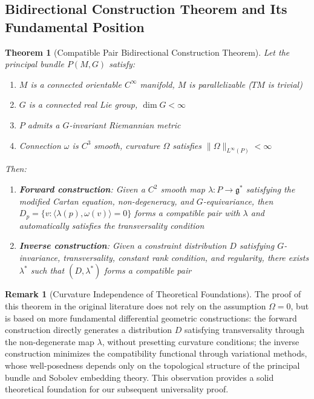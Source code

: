 \documentclass[a4paper,12pt]{extarticle}
\newtheorem{theorem}{Theorem}
\theoremstyle{definition}
\newtheorem{remark}{Remark}
\begin{document}
\subsection{Bidirectional Construction Theorem and Its Fundamental Position}

\begin{theorem}[Compatible Pair Bidirectional Construction Theorem\cite{zheng2025dynamical}]
Let the principal bundle $P(M, G)$ satisfy:
\begin{enumerate}
\item $M$ is a connected orientable $C^\infty$ manifold, $M$ is parallelizable ($TM$ is trivial)
\item $G$ is a connected real Lie group, $\dim G < \infty$
\item $P$ admits a $G$-invariant Riemannian metric
\item Connection $\omega$ is $C^3$ smooth, curvature $\Omega$ satisfies $\|\Omega\|_{L^\infty(P)} < \infty$
\end{enumerate}
Then:
\begin{enumerate}
\item \textbf{Forward construction}: Given a $C^2$ smooth map $\lambda: P \to \mathfrak{g}^*$ satisfying the modified Cartan equation, non-degeneracy, and $G$-equivariance, then $D_p = \{v: \langle\lambda(p), \omega(v)\rangle = 0\}$ forms a compatible pair with $\lambda$ and automatically satisfies the transversality condition
\item \textbf{Inverse construction}: Given a constraint distribution $D$ satisfying $G$-invariance, transversality, constant rank condition, and regularity, there exists $\lambda^*$ such that $(D, \lambda^*)$ forms a compatible pair
\end{enumerate}
\end{theorem}

\begin{remark}[Curvature Independence of Theoretical Foundations]
The proof of this theorem in the original literature\cite{zheng2025dynamical} does not rely on the assumption $\Omega = 0$, but is based on more fundamental differential geometric constructions: the forward construction directly generates a distribution $D$ satisfying transversality through the non-degenerate map $\lambda$, without presetting curvature conditions; the inverse construction minimizes the compatibility functional through variational methods, whose well-posedness depends only on the topological structure of the principal bundle and Sobolev embedding theory. This observation provides a solid theoretical foundation for our subsequent universality proof.
\end{remark}
\end{document}
